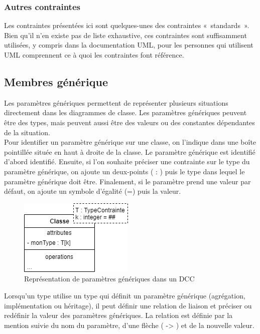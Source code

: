 \subsubsection{Autres contraintes}

Les contraintes présentées ici sont quelques-unes des contraintes «~standards~». Bien qu'il n'en existe pas de liste exhaustive, ces contraintes sont suffisamment utilisées, y compris dans la documentation UML, pour les personnes qui utilisent UML comprennent ce à quoi les contraintes font référence.

\subsection{Membres générique}
\label{ssec:genericite}

Les paramètres génériques permettent de représenter plusieurs situations directement dans les diagrammes de classe. Les paramètres génériques peuvent être des types, mais peuvent aussi être des valeurs ou des constantes dépendantes de la situation.\\

Pour identifier un paramètre générique sur une classe, on l'indique dans une boîte pointillée située en haut à droite de la classe. Le paramètre générique est identifié d'abord identifié. Ensuite, si l'on souhaite préciser une contrainte sur le type du paramètre générique, on ajoute un deux-points ( : ) puis le type dans lequel le paramètre générique doit être. Finalement, si le paramètre prend une valeur par défaut, on ajoute un symbole d'égalité (=) puis la valeur.

\begin{figure}[H]
	\caption{Représentation de paramètres génériques dans un \acrshort{DCC}}
	\centering
	\includegraphics[scale=0.7]{dcc-generique.png}
\end{figure}

Lorsqu'un type utilise un type qui définit un paramètre générique (agrégation, implémentation ou héritage), il peut définir une relation de liaison et préciser ou redéfinir la valeur des paramètres génériques. La relation est définie par la mention  suivie du nom du paramètre, d'une flèche ( -> ) et de la nouvelle valeur.

